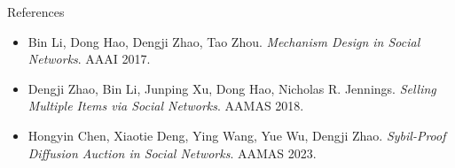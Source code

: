 \documentclass[10pt,aspectratio=169]{beamer}
\newcommand{\greenblock}[2]{\begin{exampleblock}{#1}#2\end{exampleblock}}
\begin{document}

\begin{frame}{References}
\small
\begin{itemize}
    \item Bin Li, Dong Hao, Dengji Zhao, Tao Zhou. \emph{Mechanism Design in Social Networks}. AAAI 2017.
    \item Dengji Zhao, Bin Li, Junping Xu, Dong Hao, Nicholas R. Jennings. \emph{Selling Multiple Items via Social Networks}. AAMAS 2018.
    \item Hongyin Chen, Xiaotie Deng, Ying Wang, Yue Wu, Dengji Zhao. \emph{Sybil-Proof Diffusion Auction in Social Networks}. AAMAS 2023.
\end{itemize}
\vspace{2mm}

\end{frame}

\backmatter
\end{document}
